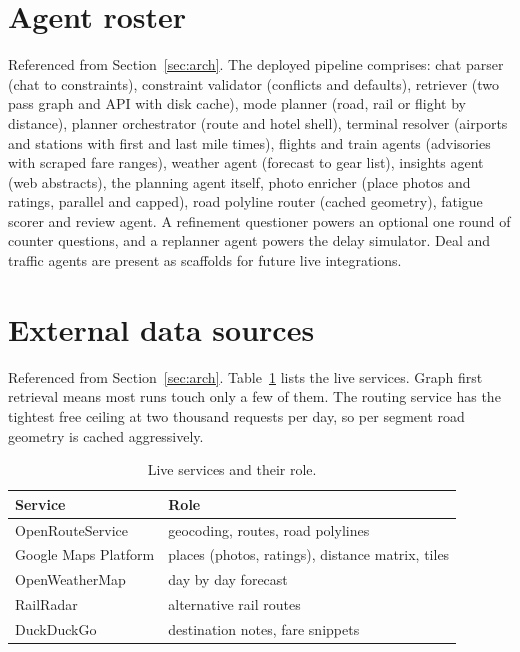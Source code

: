 \documentclass{ecai}
\begin{document}
\clearpage
\appendix

\section{Agent roster}
\label{app:nodes}
Referenced from Section~\ref{sec:arch}. The deployed pipeline comprises:
chat parser (chat to constraints), constraint validator (conflicts and
defaults), retriever (two pass graph and API with disk cache), mode planner
(road, rail or flight by distance), planner orchestrator (route and hotel
shell), terminal resolver (airports and stations with first and last mile
times), flights and train agents (advisories with scraped fare ranges), weather
agent (forecast to gear list), insights agent (web abstracts), the planning
agent itself, photo enricher (place photos and ratings, parallel and capped),
road polyline router (cached geometry), fatigue scorer and review agent. A
refinement questioner powers an optional one round of counter questions, and a
replanner agent powers the delay simulator. Deal and traffic agents are present
as scaffolds for future live integrations.

\section{External data sources}
\label{app:data}
Referenced from Section~\ref{sec:arch}. Table~\ref{tab:apis} lists the live
services. Graph first retrieval means most runs touch only a few of them. The
routing service has the tightest free ceiling at two thousand requests per day,
so per segment road geometry is cached aggressively.

\begin{table}[h]
\caption{Live services and their role.}
\label{tab:apis}
\centering
\begin{tabular}{ll}
\toprule
Service & Role \\
\midrule
OpenRouteService & geocoding, routes, road polylines \\
Google Maps Platform & places (photos, ratings), distance matrix, tiles \\
OpenWeatherMap & day by day forecast \\
RailRadar & alternative rail routes \\
DuckDuckGo & destination notes, fare snippets \\
\bottomrule
\end{tabular}
\end{table}
\end{document}
